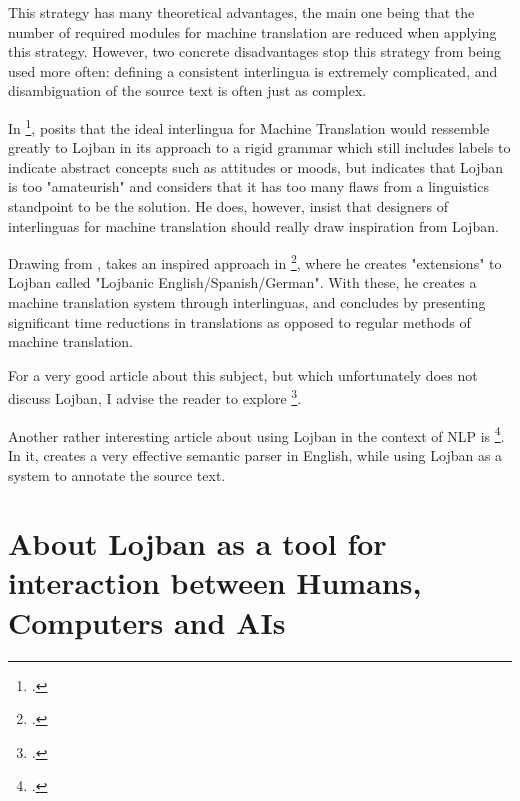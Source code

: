 This strategy has many theoretical advantages, the main one being that the number of required modules for machine translation are reduced when
applying this strategy. However, two concrete disadvantages stop this strategy from being used more often: defining a consistent interlingua is
extremely complicated, and disambiguation of the source text is often just as complex.\newline

In \footcite{nicholas1996lojban}, \citeauthor{nicholas1996lojban} posits that the ideal interlingua for Machine Translation would ressemble
greatly to Lojban in its approach to a rigid grammar which still includes labels to indicate abstract concepts such as attitudes or moods, but
indicates that Lojban is too "amateurish" and considers that it has too many flaws from a linguistics standpoint to be the solution.
He does, however, insist that designers of interlinguas for machine translation should really draw inspiration from Lojban.\newline 

Drawing from \citeauthor{nicholas1996lojban}, \citeauthor{immes2019lojbanic} takes an inspired approach in
\footcite{immes2019lojbanic}, where he creates "extensions" to Lojban called "Lojbanic English/Spanish/German".
With these, he creates a machine translation system through interlinguas, and concludes by presenting significant time reductions in translations
as opposed to regular methods of machine translation.\newline

For a very good article about this subject, but which unfortunately does not discuss Lojban, I advise the reader to explore
\footcite{machinetranslationconlangs}. \newline

Another rather interesting article about using Lojban in the context of NLP is \footcite{hintz2014semantic}. In it,
\citeauthor{hintz2014semantic} creates a very effective semantic parser in English, while using Lojban as a system to annotate the source text.

\newpage

\section{About Lojban as a tool for interaction between Humans, Computers and AIs}

